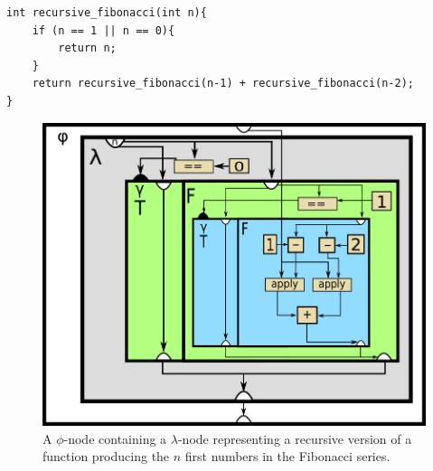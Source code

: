 \begin{lstlisting}[label={lst:rec_fib_phi}, style=customcpp,
caption={C/C++ code corresponding to the RVSDG subgraph in
Figure~\ref{fig:for_loop_rec_fib_print_ex}, which represents a simple recursive
fibonacci function.}]
int recursive_fibonacci(int n){
	if (n == 1 || n == 0){
		return n;
	}
	return recursive_fibonacci(n-1) + recursive_fibonacci(n-2);
}
\end{lstlisting}
\vspace{-4\parskip} %

\begin{figure}[h!]
	\centering
	\includegraphics[width=\textwidth]{figures/recursive_fibonacci}
	\caption{A $\phi$-node containing a $\lambda$-node representing a recursive
version of a function producing the $n$ first numbers in the Fibonacci series.}
	\label{fig:rec_fib_phi}
\end{figure}
